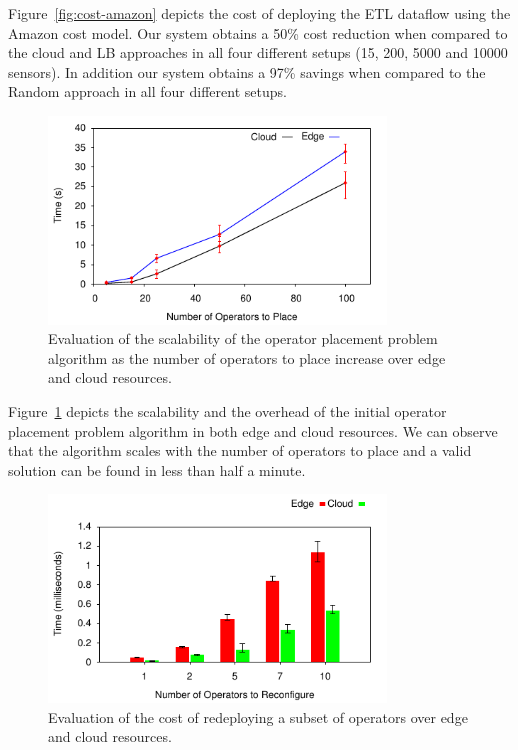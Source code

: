 
Figure~\ref{fig:cost-amazon} depicts the cost of deploying the ETL dataflow using the Amazon cost model. Our system obtains a 50\% cost reduction when compared to the cloud and LB approaches in all four different setups (15, 200, 5000 and 10000 sensors). In addition our system obtains a 97\% savings when compared to the Random approach in all four different setups.

\begin{figure}[h]
  \centering
  \includegraphics[width=0.8\textwidth]{Results/Scale.pdf}
  \caption{Evaluation of the scalability of the operator placement problem algorithm as the number of operators to place increase over edge and cloud resources.}\label{fig:scalefirst}
\end{figure}

Figure~\ref{fig:scalefirst} depicts the scalability and the overhead of the initial operator placement problem algorithm in both edge and cloud resources. We can observe that the algorithm scales with the number of operators to place and a valid solution can be found in less than half a minute.

\begin{figure}[h]
  \centering
  \includegraphics[width=0.8\textwidth]{Results/Redeploy.pdf}
  \caption{Evaluation of the cost of redeploying a subset of operators over edge and cloud resources.}\label{fig:scalesecond}
\end{figure}

